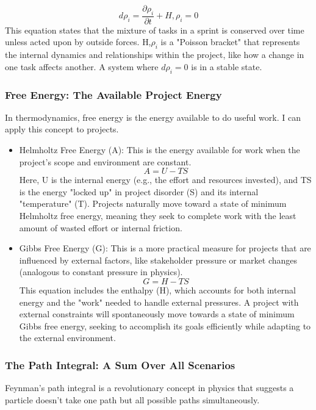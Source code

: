 \documentclass{article}
\begin{document}
\begin{equation}
d\rho_i = \frac{\partial{\rho_i}}{\partial t} + {H, \rho_i} =0
\end{equation}
This equation states that the mixture of tasks in a sprint is conserved over time unless acted upon by outside forces. {H,$\rho_i$} is a "Poisson bracket" that represents the internal dynamics and relationships within the project, like how a change in one task affects another. A system where $d\rho_i=0$ is in a stable state.

\subsubsection*{Free Energy: The Available Project Energy}
In thermodynamics, free energy is the energy available to do useful work. I can apply this concept to projects.

\begin{itemize}
\item Helmholtz Free Energy (A): This is the energy available for work when the project's scope and environment are constant.
\begin{equation}
A = U - TS
\end{equation}
Here, U is the internal energy (e.g., the effort and resources invested), and TS is the energy "locked up" in project disorder (S) and its internal "temperature" (T). Projects naturally move toward a state of minimum Helmholtz free energy, meaning they seek to complete work with the least amount of wasted effort or internal friction.
\item Gibbs Free Energy (G): This is a more practical measure for projects that are influenced by external factors, like stakeholder pressure or market changes (analogous to constant pressure in physics).
\begin{equation}
G = H - TS
\end{equation}
This equation includes the enthalpy (H), which accounts for both internal energy and the "work" needed to handle external pressures. A project with external constraints will spontaneously move towards a state of minimum Gibbs free energy, seeking to accomplish its goals efficiently while adapting to the external environment.
\end{itemize}

\subsubsection*{The Path Integral: A Sum Over All Scenarios}
Feynman's path integral is a revolutionary concept in physics that suggests a particle doesn't take one path but all possible paths simultaneously. 
\end{document}
